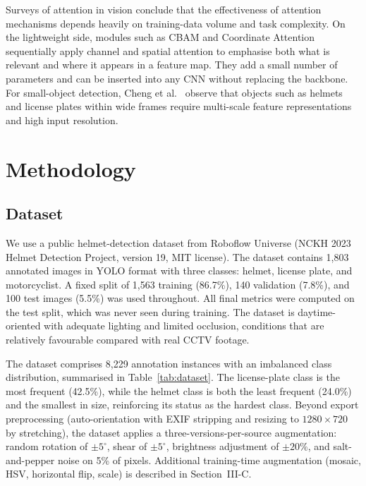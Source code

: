 \documentclass[conference]{IEEEtran}
\begin{document}
Surveys of attention in vision \cite{ref17, ref18} conclude that the effectiveness of attention mechanisms depends heavily on training-data volume and task complexity. On the lightweight side, modules such as CBAM \cite{ref9} and Coordinate Attention \cite{ref_coordatt} sequentially apply channel and spatial attention to emphasise both what is relevant and where it appears in a feature map. They add a small number of parameters and can be inserted into any CNN without replacing the backbone. For small-object detection, Cheng et al.\ \cite{ref23} observe that objects such as helmets and license plates within wide frames require multi-scale feature representations and high input resolution.

\section{Methodology}

\subsection{Dataset}

We use a public helmet-detection dataset from Roboflow Universe (NCKH 2023 Helmet Detection Project, version 19, MIT license). The dataset contains 1{,}803 annotated images in YOLO format with three classes: helmet, license plate, and motorcyclist. A fixed split of 1{,}563 training (86.7\%), 140 validation (7.8\%), and 100 test images (5.5\%) was used throughout. All final metrics were computed on the test split, which was never seen during training. The dataset is daytime-oriented with adequate lighting and limited occlusion, conditions that are relatively favourable compared with real CCTV footage.

The dataset comprises 8{,}229 annotation instances with an imbalanced class distribution, summarised in Table~\ref{tab:dataset}. The license-plate class is the most frequent (42.5\%), while the helmet class is both the least frequent (24.0\%) and the smallest in size, reinforcing its status as the hardest class. Beyond export preprocessing (auto-orientation with EXIF stripping and resizing to $1280\times720$ by stretching), the dataset applies a three-versions-per-source augmentation: random rotation of $\pm5^\circ$, shear of $\pm5^\circ$, brightness adjustment of $\pm20\%$, and salt-and-pepper noise on 5\% of pixels. Additional training-time augmentation (mosaic, HSV, horizontal flip, scale) is described in Section~III-C.
\end{document}
